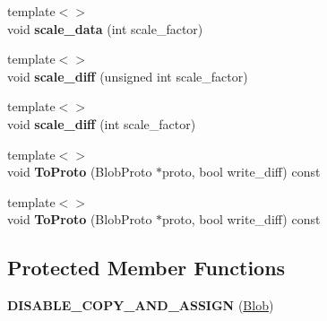 \begin{DoxyCompactItemize}
\item 
{\footnotesize template$<$$>$ }\\void {\bfseries scale\+\_\+data} (int scale\+\_\+factor)\hypertarget{classcaffe_1_1Blob_a99de38dc8933f2f6d410eb9cd05aeaa0}{}\label{classcaffe_1_1Blob_a99de38dc8933f2f6d410eb9cd05aeaa0}

\item 
{\footnotesize template$<$$>$ }\\void {\bfseries scale\+\_\+diff} (unsigned int scale\+\_\+factor)\hypertarget{classcaffe_1_1Blob_aaf182851c1d42c79928e9fc2fd6a652e}{}\label{classcaffe_1_1Blob_aaf182851c1d42c79928e9fc2fd6a652e}

\item 
{\footnotesize template$<$$>$ }\\void {\bfseries scale\+\_\+diff} (int scale\+\_\+factor)\hypertarget{classcaffe_1_1Blob_a8eab6dc0ff159e72845774db6f032918}{}\label{classcaffe_1_1Blob_a8eab6dc0ff159e72845774db6f032918}

\item 
{\footnotesize template$<$$>$ }\\void {\bfseries To\+Proto} (Blob\+Proto $\ast$proto, bool write\+\_\+diff) const\hypertarget{classcaffe_1_1Blob_af20401e9b2ad7c89aa7c77711f653b7a}{}\label{classcaffe_1_1Blob_af20401e9b2ad7c89aa7c77711f653b7a}

\item 
{\footnotesize template$<$$>$ }\\void {\bfseries To\+Proto} (Blob\+Proto $\ast$proto, bool write\+\_\+diff) const\hypertarget{classcaffe_1_1Blob_ae21cbe8230094762001913bdaee472a7}{}\label{classcaffe_1_1Blob_ae21cbe8230094762001913bdaee472a7}

\end{DoxyCompactItemize}
\subsection*{Protected Member Functions}
\begin{DoxyCompactItemize}
\item 
{\bfseries D\+I\+S\+A\+B\+L\+E\+\_\+\+C\+O\+P\+Y\+\_\+\+A\+N\+D\+\_\+\+A\+S\+S\+I\+GN} (\hyperlink{classcaffe_1_1Blob}{Blob})\hypertarget{classcaffe_1_1Blob_a603f1a5472e5fae9ca8fec62f6d5c581}{}\label{classcaffe_1_1Blob_a603f1a5472e5fae9ca8fec62f6d5c581}

\end{DoxyCompactItemize}
